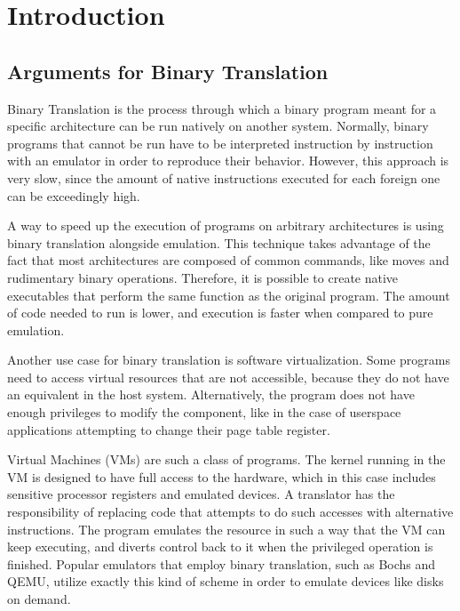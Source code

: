 \section{Introduction}

\subsection{Arguments for Binary Translation}

Binary Translation is the process through which a binary program meant for a
specific architecture can be run natively on another system.  Normally, binary
programs that cannot be run have to be interpreted instruction by instruction
with an emulator in order to reproduce their behavior.  However, this approach is
very slow, since the amount of native instructions executed for each foreign
one can be exceedingly high.

A way to speed up the execution of programs on arbitrary architectures is using
binary translation alongside emulation.  This technique takes advantage of the
fact that most architectures are composed of common commands, like moves and
rudimentary binary operations.  Therefore, it is possible to create native
executables that perform the same function as the original program.  The amount
of code needed to run is lower, and execution is faster when compared to pure emulation.

Another use case for binary translation is software virtualization.  Some
programs need to access virtual resources that are not accessible, because they do not have  
an equivalent in the host system.  Alternatively, the program does not have enough
privileges to modify the component, like in the case of userspace applications
attempting to change their page table register.

Virtual Machines (VMs) are such a class of programs.  The kernel running in the
VM is designed to have full access to the hardware, which in this case includes
sensitive processor registers and emulated devices.  A translator has the
responsibility of replacing code that attempts to do such accesses with
alternative instructions.  The program
emulates the resource in such a way that the VM can keep executing, and diverts
control back to it when the privileged operation is finished.  Popular emulators that employ binary translation, such as
Bochs\cite{lawton1996bochs} and QEMU\cite{bellard2005qemu}, utilize exactly this kind of scheme in order to emulate devices
like disks on demand.

